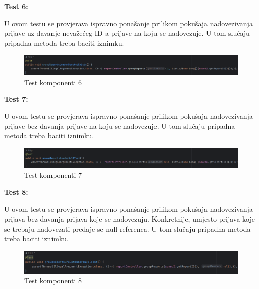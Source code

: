 			\textbf{Test 6:}
			
			U ovom testu se provjerava ispravno ponašanje prilikom pokušaja nadovezivanja prijave uz davanje nevažećeg ID-a prijave na koju se nadovezuje. U tom slučaju pripadna metoda treba baciti iznimku.
			
			\begin{figure}[H]
				\includegraphics[width=\textwidth]{slike/JUnitTest6.png} %
				\caption{Test komponenti 6}
				\label{fig:JUnitTest6} %
			\end{figure}
			
			\textbf{Test 7:}
			
			U ovom testu se provjerava ispravno ponašanje prilikom pokušaja nadovezivanja prijave bez davanja prijave na koju se nadovezuje. U tom slučaju pripadna metoda treba baciti iznimku.
			
			\begin{figure}[H]
				\includegraphics[width=\textwidth]{slike/JUnitTest7.png} %
				\caption{Test komponenti 7}
				\label{fig:JUnitTest7} %
			\end{figure}
			
			\textbf{Test 8:}
			
			U ovom testu se provjerava ispravno ponašanje prilikom pokušaja nadovezivanja prijava bez davanja prijava koje se nadovezuju. Konkretnije, umjesto prijava koje se trebaju nadovezati predaje se null referenca. U tom slučaju pripadna metoda treba baciti iznimku.
			
			\begin{figure}[H]
				\includegraphics[width=\textwidth]{slike/JUnitTest8.png} %
				\caption{Test komponenti 8}
				\label{fig:JUnitTest8} %
			\end{figure}
			
